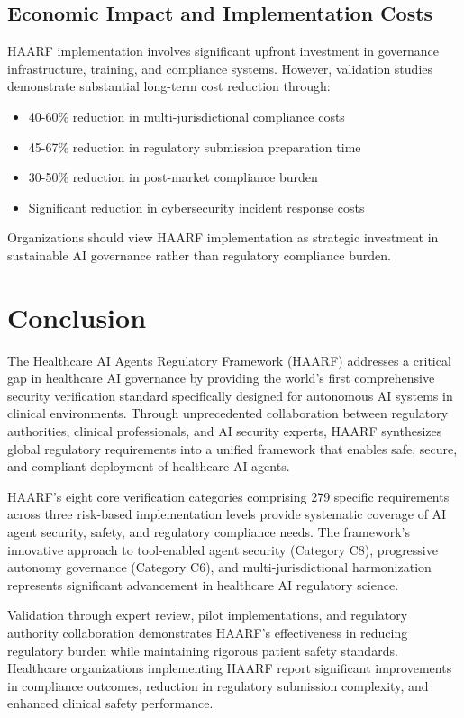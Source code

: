 \documentclass[11pt]{article}
\begin{document}
\subsection{Economic Impact and Implementation Costs}

HAARF implementation involves significant upfront investment in governance infrastructure, training, and compliance systems. However, validation studies demonstrate substantial long-term cost reduction through:

\begin{itemize}
    \item 40-60\% reduction in multi-jurisdictional compliance costs
    \item 45-67\% reduction in regulatory submission preparation time
    \item 30-50\% reduction in post-market compliance burden
    \item Significant reduction in cybersecurity incident response costs
\end{itemize}

Organizations should view HAARF implementation as strategic investment in sustainable AI governance rather than regulatory compliance burden.

\section{Conclusion}

The Healthcare AI Agents Regulatory Framework (HAARF) addresses a critical gap in healthcare AI governance by providing the world's first comprehensive security verification standard specifically designed for autonomous AI systems in clinical environments. Through unprecedented collaboration between regulatory authorities, clinical professionals, and AI security experts, HAARF synthesizes global regulatory requirements into a unified framework that enables safe, secure, and compliant deployment of healthcare AI agents.

HAARF's eight core verification categories comprising 279 specific requirements across three risk-based implementation levels provide systematic coverage of AI agent security, safety, and regulatory compliance needs. The framework's innovative approach to tool-enabled agent security (Category C8), progressive autonomy governance (Category C6), and multi-jurisdictional harmonization represents significant advancement in healthcare AI regulatory science.

Validation through expert review, pilot implementations, and regulatory authority collaboration demonstrates HAARF's effectiveness in reducing regulatory burden while maintaining rigorous patient safety standards. Healthcare organizations implementing HAARF report significant improvements in compliance outcomes, reduction in regulatory submission complexity, and enhanced clinical safety performance.
\end{document}

